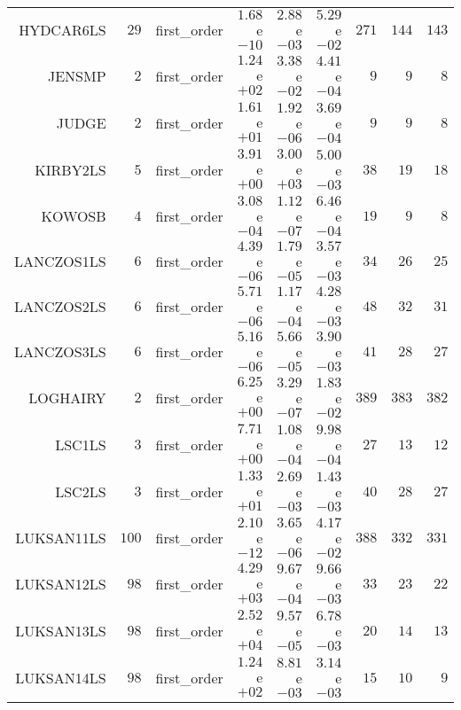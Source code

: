 \begin{longtable}{rrrrrrrrr}
HYDCAR6LS & \(    29\) & first\_order & \( 1.68\)e\(-10\) & \( 2.88\)e\(-03\) & \( 5.29\)e\(-02\) & \(   271\) & \(   144\) & \(   143\) \\
JENSMP & \(     2\) & first\_order & \( 1.24\)e\(+02\) & \( 3.38\)e\(-02\) & \( 4.41\)e\(-04\) & \(     9\) & \(     9\) & \(     8\) \\
JUDGE & \(     2\) & first\_order & \( 1.61\)e\(+01\) & \( 1.92\)e\(-06\) & \( 3.69\)e\(-04\) & \(     9\) & \(     9\) & \(     8\) \\
KIRBY2LS & \(     5\) & first\_order & \( 3.91\)e\(+00\) & \( 3.00\)e\(+03\) & \( 5.00\)e\(-03\) & \(    38\) & \(    19\) & \(    18\) \\
KOWOSB & \(     4\) & first\_order & \( 3.08\)e\(-04\) & \( 1.12\)e\(-07\) & \( 6.46\)e\(-04\) & \(    19\) & \(     9\) & \(     8\) \\
LANCZOS1LS & \(     6\) & first\_order & \( 4.39\)e\(-06\) & \( 1.79\)e\(-05\) & \( 3.57\)e\(-03\) & \(    34\) & \(    26\) & \(    25\) \\
LANCZOS2LS & \(     6\) & first\_order & \( 5.71\)e\(-06\) & \( 1.17\)e\(-04\) & \( 4.28\)e\(-03\) & \(    48\) & \(    32\) & \(    31\) \\
LANCZOS3LS & \(     6\) & first\_order & \( 5.16\)e\(-06\) & \( 5.66\)e\(-05\) & \( 3.90\)e\(-03\) & \(    41\) & \(    28\) & \(    27\) \\
LOGHAIRY & \(     2\) & first\_order & \( 6.25\)e\(+00\) & \( 3.29\)e\(-07\) & \( 1.83\)e\(-02\) & \(   389\) & \(   383\) & \(   382\) \\
LSC1LS & \(     3\) & first\_order & \( 7.71\)e\(+00\) & \( 1.08\)e\(-04\) & \( 9.98\)e\(-04\) & \(    27\) & \(    13\) & \(    12\) \\
LSC2LS & \(     3\) & first\_order & \( 1.33\)e\(+01\) & \( 2.69\)e\(-03\) & \( 1.43\)e\(-03\) & \(    40\) & \(    28\) & \(    27\) \\
LUKSAN11LS & \(   100\) & first\_order & \( 2.10\)e\(-12\) & \( 3.65\)e\(-06\) & \( 4.17\)e\(-02\) & \(   388\) & \(   332\) & \(   331\) \\
LUKSAN12LS & \(    98\) & first\_order & \( 4.29\)e\(+03\) & \( 9.67\)e\(-04\) & \( 9.66\)e\(-03\) & \(    33\) & \(    23\) & \(    22\) \\
LUKSAN13LS & \(    98\) & first\_order & \( 2.52\)e\(+04\) & \( 9.57\)e\(-05\) & \( 6.78\)e\(-03\) & \(    20\) & \(    14\) & \(    13\) \\
LUKSAN14LS & \(    98\) & first\_order & \( 1.24\)e\(+02\) & \( 8.81\)e\(-03\) & \( 3.14\)e\(-03\) & \(    15\) & \(    10\) & \(     9\) \\

\end{longtable}

